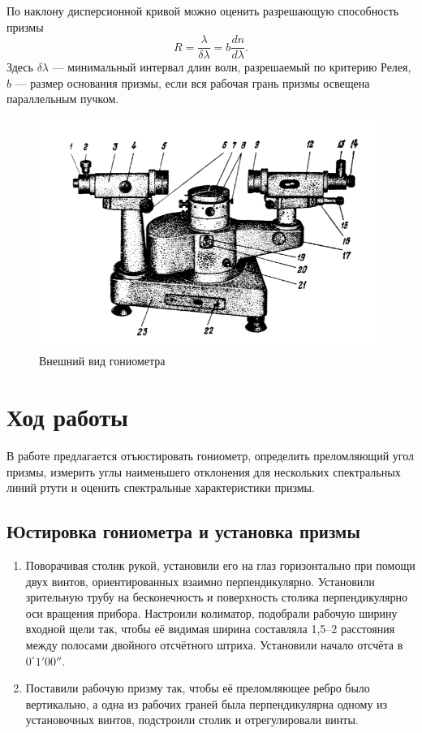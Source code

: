 \documentclass[a4paper, 12pt]{article}%
\begin{document}
	По наклону дисперсионной кривой можно оценить разрешающую
	способность призмы
	\begin{equation}
	R = \dfrac{\lambda}{\delta\lambda} = b\dfrac{dn}{d\lambda}.
	\end{equation}
	Здесь $\delta\lambda$ --- минимальный интервал длин волн, разрешаемый по критерию Релея, $b$ --- размер основания призмы, если вся рабочая грань призмы освещена параллельным пучком.
	
		\begin{figure}[!h]
		\begin{center}
			\includegraphics[scale = 0.40]{pic/443-2.png}
			\caption{Внешний вид гониометра}
		\end{center}
	\end{figure}

\section{Ход работы}
В работе предлагается отъюстировать гониометр, определить преломляющий угол призмы, измерить углы наименьшего отклонения для нескольких спектральных линий ртути и оценить спектральные характеристики призмы.
	\subsection*{Юстировка гониометра и установка призмы}
	\begin{enumerate}
		\item Поворачивая столик рукой, установили его на глаз горизонтально при помощи двух винтов, ориентированных взаимно перпендикулярно. Установили зрительную трубу на бесконечность и поверхность столика перпендикулярно оси вращения прибора. Настроили колиматор, подобрали рабочую ширину входной щели так, чтобы её видимая ширина составляла 1,5–2 расстояния между полосами двойного отсчётного штриха. Установили начало отсчёта в $0^\circ1'00''$.
		
		\item Поставили рабочую призму так, чтобы её преломляющее ребро было вертикально, а одна из рабочих граней была перпендикулярна одному из установочных винтов, подстроили столик и отрегулировали винты.
	\end{enumerate}
	
\end{document}
